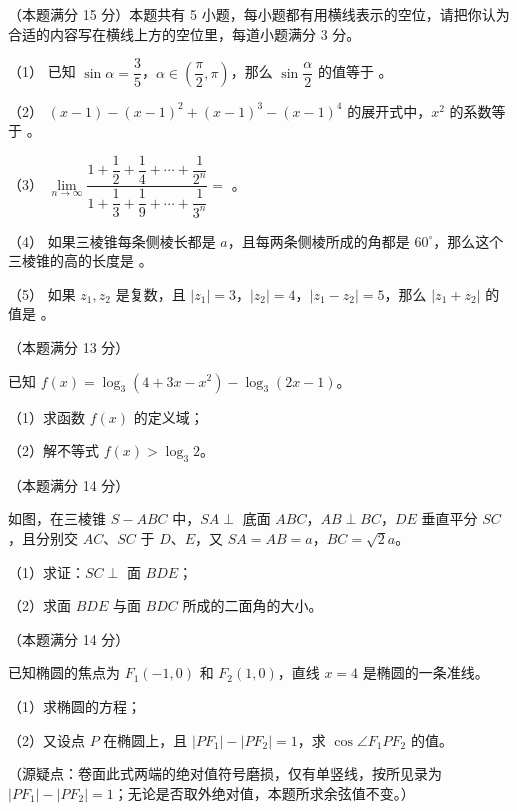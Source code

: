 \begin{question}
（本题满分 15 分）本题共有 5 小题，每小题都有用横线表示的空位，请把你认为合适的内容写在横线上方的空位里，每道小题满分 3 分。

（1） 已知 $\sin\alpha=\dfrac35$，$\alpha\in\left(\dfrac{\pi}{2},\pi\right)$，那么 $\sin\dfrac{\alpha}{2}$ 的值等于 \gkblank{}。

（2） $(x-1)-(x-1)^2+(x-1)^3-(x-1)^4$ 的展开式中，$x^2$ 的系数等于 \gkblank{}。

（3） $\lim\limits_{n\to\infty}\dfrac{1+\dfrac12+\dfrac14+\cdots+\dfrac{1}{2^n}}{1+\dfrac13+\dfrac19+\cdots+\dfrac{1}{3^n}}=$ \gkblank{}。

（4） 如果三棱锥每条侧棱长都是 $a$，且每两条侧棱所成的角都是 $60^\circ$，那么这个三棱锥的高的长度是 \gkblank{}。

（5） 如果 $z_1,z_2$ 是复数，且 $|z_1|=3$，$|z_2|=4$，$|z_1-z_2|=5$，那么 $|z_1+z_2|$ 的值是 \gkblank{}。

\end{question}
\begin{question}
（本题满分 13 分）

已知 $f(x)=\log_3(4+3x-x^2)-\log_3(2x-1)$。

（1）求函数 $f(x)$ 的定义域；

（2）解不等式 $f(x)>\log_3 2$。

\Needspace{0.4\textheight}
\end{question}
\begin{question}
（本题满分 14 分）

如图，在三棱锥 $S-ABC$ 中，$SA\perp$ 底面 $ABC$，$AB\perp BC$，$DE$ 垂直平分 $SC$，且分别交 $AC$、$SC$ 于 $D$、$E$，又 $SA=AB=a$，$BC=\sqrt2 a$。

（1）求证：$SC\perp$ 面 $BDE$；

（2）求面 $BDE$ 与面 $BDC$ 所成的二面角的大小。
\nopagebreak[4]
\begin{center}\end{center}
\nopagebreak[4]
\end{question}
\begin{question}
（本题满分 14 分）

已知椭圆的焦点为 $F_1(-1,0)$ 和 $F_2(1,0)$，直线 $x=4$ 是椭圆的一条准线。

（1）求椭圆的方程；

（2）又设点 $P$ 在椭圆上，且 $|PF_1|-|PF_2|=1$，求 $\cos\angle F_1PF_2$ 的值。

（源疑点：卷面此式两端的绝对值符号磨损，仅有单竖线，按所见录为 $|PF_1|-|PF_2|=1$；无论是否取外绝对值，本题所求余弦值不变。）

\end{question}
